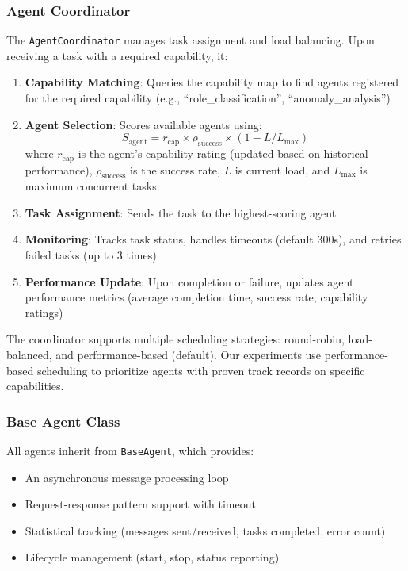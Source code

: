 \subsubsection{Agent Coordinator}
The \texttt{AgentCoordinator} manages task assignment and load balancing. Upon receiving a task with a required capability, it:

\begin{enumerate}
    \item \textbf{Capability Matching}: Queries the capability map to find agents registered for the required capability (e.g., ``role\_classification'', ``anomaly\_analysis'')
    \item \textbf{Agent Selection}: Scores available agents using:
    \begin{equation}
    S_{\text{agent}} = r_{\text{cap}} \times \rho_{\text{success}} \times (1 - L / L_{\text{max}})
    \label{eq:agent-score}
    \end{equation}
    where $r_{\text{cap}}$ is the agent's capability rating (updated based on historical performance), $\rho_{\text{success}}$ is the success rate, $L$ is current load, and $L_{\text{max}}$ is maximum concurrent tasks.
    \item \textbf{Task Assignment}: Sends the task to the highest-scoring agent
    \item \textbf{Monitoring}: Tracks task status, handles timeouts (default 300s), and retries failed tasks (up to 3 times)
    \item \textbf{Performance Update}: Upon completion or failure, updates agent performance metrics (average completion time, success rate, capability ratings)
\end{enumerate}

The coordinator supports multiple scheduling strategies: round-robin, load-balanced, and performance-based (default). Our experiments use performance-based scheduling to prioritize agents with proven track records on specific capabilities.

\subsubsection{Base Agent Class}
All agents inherit from \texttt{BaseAgent}, which provides:
\begin{itemize}
    \item An asynchronous message processing loop
    \item Request-response pattern support with timeout
    \item Statistical tracking (messages sent/received, tasks completed, error count)
    \item Lifecycle management (start, stop, status reporting)
\end{itemize}

